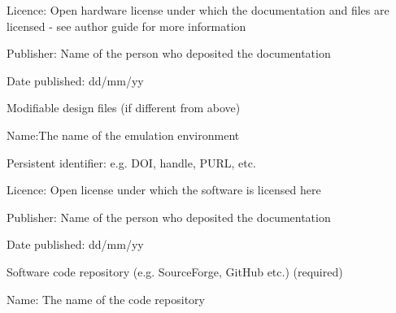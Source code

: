 \documentclass[a4paper]{article}
\begin{document}
Licence: Open hardware license under which the documentation and
files are licensed - see author guide for more information

Publisher: Name of the person who deposited the documentation

Date published: dd/mm/yy

Modifiable design files (if different from above)

Name:The name of the emulation environment

Persistent identifier: e.g. DOI, handle, PURL, etc.

Licence: Open license under which the software is licensed here

Publisher: Name of the person who deposited the documentation

Date published: dd/mm/yy

Software code repository (e.g. SourceForge, GitHub etc.)
(required)

Name: The name of the code repository
\end{document}
